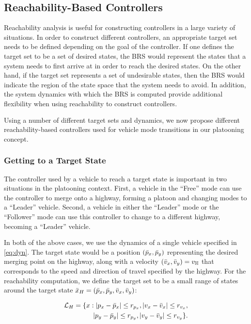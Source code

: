 \subsection{Reachability-Based Controllers \label{sec:reach_ctrl}}
Reachability analysis is useful for constructing controllers in a large variety of situations. In order to construct different controllers, an appropriate target set needs to be defined depending on the goal of the controller. If one defines the target set to be a set of desired states, the BRS would represent the states that a system needs to first arrive at in order to reach the desired states. On the other hand, if the target set represents a set of undesirable states, then the BRS would indicate the region of the state space that the system needs to avoid. In addition, the system dynamics with which the BRS is computed provide additional flexibility when using reachability to construct controllers.

Using a number of different target sets and dynamics, we now propose different reachability-based controllers used for vehicle mode transitions in our platooning concept.

\subsubsection{Getting to a Target State \label{sec:abs_target_ctrl}}
The controller used by a vehicle to reach a target state is important in two situations in the platooning context. First, a vehicle in the ``Free'' mode can use the controller to merge onto a highway, forming a platoon and changing modes to a ``Leader'' vehicle. Second, a vehicle in either the ``Leader'' mode or the ``Follower'' mode can use this controller to change to a different highway, becoming a ``Leader'' vehicle. 

In both of the above cases, we use the dynamics of a single vehicle specified in \eqref{eq:dyn}. The target state would be a position $(\bar{p}_x, \bar{p}_y)$ representing the desired merging point on the highway, along with a velocity $(\bar{v}_x, \bar{v}_y)=v_{\mathbb{H}}$ that corresponds to the speed and direction of travel specified by the highway. For the reachability computation, we define the target set to be a small range of states around the target state $\bar x_H = (\bar{p}_x, \bar{p}_y, \bar{v}_x, \bar{v}_y)$:

\begin{equation}
\begin{aligned}
\mathcal{L}_H = \{x: |p_x-\bar{p}_x|\le r_{p_x}, |v_x-\bar{v}_x|\le r_{v_x}, \\
|p_y - \bar{p}_y| \le r_{p_y}, |v_y - \bar{v}_y|\le r_{v_y} \}.
\end{aligned}
\end{equation}

